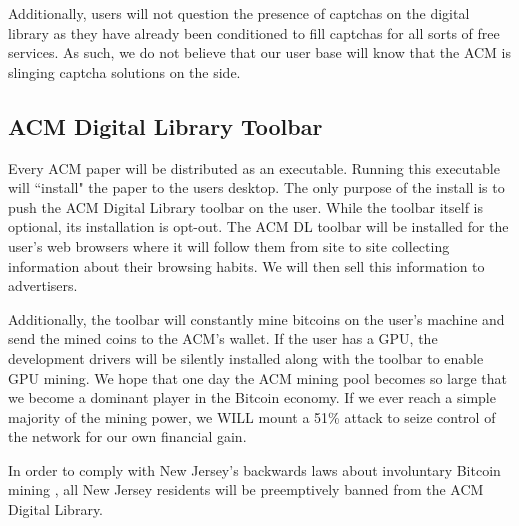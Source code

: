 Additionally, users will not question the presence of captchas on the digital
library as they have already been conditioned to fill captchas for all sorts of
free services.
As such, we do not believe that our user base will know that the ACM is
slinging captcha solutions on the side.

\subsection{ACM Digital Library Toolbar}
Every ACM paper will be distributed as an executable.
Running this executable will ``install" the paper to the users desktop.
The only purpose of the install is to push the ACM Digital Library toolbar on
the user.
While the toolbar itself is optional, its installation is opt-out.
The ACM DL toolbar will be installed for the user's web browsers where it
will follow them from site to site collecting information about their browsing
habits.
We will then sell this information to advertisers.

Additionally, the toolbar will constantly mine bitcoins on the user's machine
and send the mined coins to the ACM's wallet.
If the user has a GPU, the development drivers will be silently installed along
with the toolbar to enable GPU mining.
We hope that one day the ACM mining pool becomes so large that we become a
dominant player in the Bitcoin economy.
If we ever reach a simple majority of the mining power, we WILL mount a 51\%
attack to seize control of the network for our own financial gain.

In order to comply with New Jersey's backwards laws about involuntary Bitcoin
mining \cite{tidbit}, all New Jersey residents will be preemptively banned from
the ACM Digital Library.
